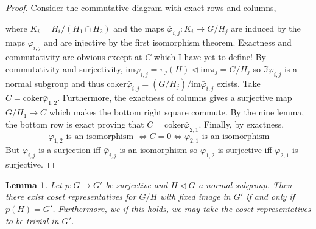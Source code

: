 \documentclass{article}
\newcommand{\bphi}{\bar{\varphi}}
\newcommand{\coker}[0]{\mathrm{coker}}
\newcommand{\im}[0]{\mathrm{im}}
\newtheorem{lemma}[theorem]{Lemma}
\theoremstyle{definition}
\theoremstyle{definition}
\theoremstyle{remark}
\begin{document}
\begin{proof}
Consider the commutative diagram with exact rows and columns,
\begin{center}
\end{center}
where $K_i = H_i / (H_1 \cap H_2)$ and the maps $\bphi_{i,j} : K_i \to G/H_j$ are induced by the maps $\varphi_{i,j}$ and are injective by the first isomorphism theorem. Exactness and commutativity are obvious except at $C$ which I have yet to define! By commutativity and surjectivity, $\im{\bphi_{i,j}} = \pi_j(H) \triangleleft \im{\pi_j} = G/H_j$ so $\Im{\bphi_{i,j}}$ is a normal subgroup and thus $\coker{\bphi_{i,j}} = (G/H_j) / \im{\bphi_{i,j}} $ exists. Take $C = \coker{\bphi_{1,2}}$. Furthermore, the exactness of columns gives a surjective map $G/H_1 \to C$ which makes the bottom right square commute. By the nine lemma, the bottom row is exact proving that $C = \coker{\bphi_{2,1}}$. Finally, by exactness, 
\[ \bphi_{1,2} \text{ is an isomorphism } \iff C = 0 \iff \bphi_{2,1} \text{ is an isomorphism}  \]
But $\varphi_{i,j}$ is a surjection iff $\bphi_{i,j}$ is an isomorphism so $\varphi_{1,2}$ is surjective iff $\varphi_{2,1}$ is surjective. 
\end{proof}


\begin{lemma} \label{lem:surjective_map_coset_reps}
Let $p : G \to G'$ be surjective and $H \triangleleft G$ a normal subgroup. Then there exist coset representatives for $G/H$ with fixed image in $G'$ if and only if $p(H) = G'$. Furthermore, we if this holds, we may take the coset representatives to be trivial in $G'$. 
\end{lemma}
\end{document}
